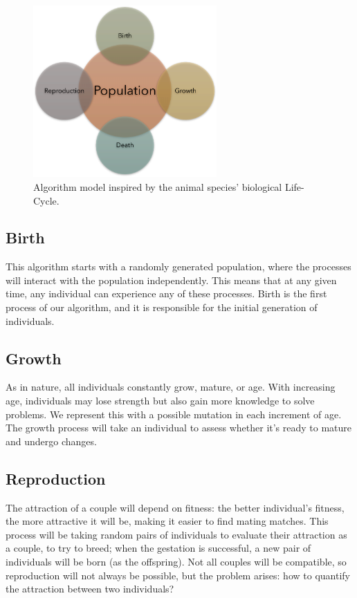 \documentclass[runningheads]{llncs}
\begin{document}
\begin{figure}
    \centering
    \includegraphics[width=70mm]{img/fig2_proposal.pdf}
    \caption{Algorithm model inspired by the animal species' biological Life-Cycle.} \label{fig2}
    \end{figure}

\subsection{Birth}

This algorithm starts with a randomly generated population, where the processes
will interact with the population independently. This means that at any given
time, any individual can experience any of these processes. Birth is the first
process of our algorithm, and it is responsible for the initial generation of
individuals.

\subsection{Growth}

As in nature, all individuals constantly grow, mature, or age. With increasing
age, individuals may lose strength but also gain more knowledge to solve
problems. We represent this with a possible mutation in each increment of age.
The growth process will take an individual to assess whether it's ready to
mature and undergo changes.

\subsection{Reproduction}

The attraction of a couple will depend on fitness: the better individual's
fitness, the more attractive it will be, making it easier to find mating
matches. This process will be taking random pairs of individuals to evaluate
their attraction as a couple, to try to breed; when the gestation is
successful, a new pair of individuals will be born (as the offspring). Not all
couples will be compatible, so reproduction will not always be possible, but
the problem arises: how to quantify the attraction between two individuals?
\end{document}
